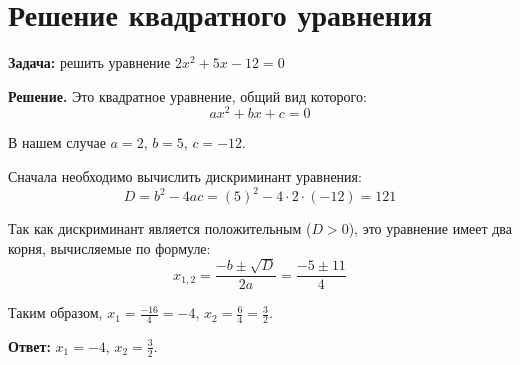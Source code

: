 \documentclass[12pt]{article}
\begin{document}
\section{Решение квадратного уравнения}

\textbf{Задача:} решить уравнение \(2x^2 + 5x - 12 = 0\)

\textbf{Решение.} Это квадратное уравнение, общий вид которого:
\[
ax^2 + bx + c = 0
\]

В нашем случае \(a = 2\), \(b = 5\), \(c = -12\).

Сначала необходимо вычислить дискриминант уравнения:
\[
D = b^2 - 4ac = (5)^2 - 4 \cdot 2 \cdot (-12) = 121
\]

Так как дискриминант является положительным (\(D > 0\)), это уравнение имеет два корня, вычисляемые по формуле:
\[
x_{1,2} = \frac{-b \pm \sqrt{D}}{2a} = \frac{-5 \pm 11}{4}
\]

Таким образом, \(x_1 = \frac{-16}{4} = -4\), \(x_2 = \frac{6}{4} = \frac{3}{2}\).

\textbf{Ответ:} \(x_1 = -4\), \(x_2 = \frac{3}{2}\).
\end{document}
